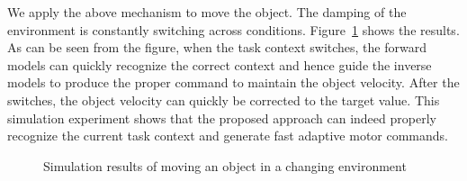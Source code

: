 We apply the above mechanism to move the object. The damping of the environment is constantly switching across conditions.
Figure~\ref{fig:result_sim} shows the results. As can be seen from the figure, when the task context switches, the forward models can quickly recognize the correct context and hence guide the inverse models to produce the proper command to maintain the object velocity. After the switches, the object velocity can quickly be corrected to the target value. This simulation experiment shows that the proposed approach can indeed properly recognize the current task context and generate fast adaptive motor commands.

\begin{figure}
  \centering

  \vspace{0.3cm}

  \vspace{0.3cm}
%

  \caption{ \scriptsize{Simulation results of moving an object in a changing environment}
}
\label{fig:result_sim}
\end{figure} 
